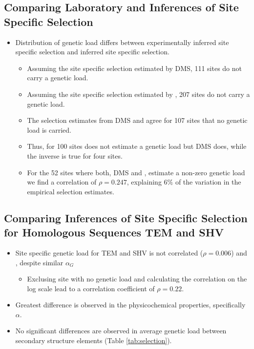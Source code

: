 \documentclass[12pt]{article}
\begin{document}
\subsection*{Comparing Laboratory and \selac Inferences of Site Specific Selection}
\begin{itemize}
	\item Distribution of genetic load differs between experimentally inferred site specific selection and \selac inferred site specific selection.
	\begin{itemize}
		\item Assuming the site specific selection estimated by DMS, 111 sites do not carry a genetic load.
		\item Assuming the site specific selection estimated by \selac, 207 sites do not carry a genetic load.
		\item The selection estimates from DMS and \selac agree for 107 sites that no genetic load is carried.
		\item Thus, for 100 sites \selac does not estimate a genetic load but DMS does, while the inverse is true for four sites.
		\item For the 52 sites where both, DMS and \selac, estimate a non-zero genetic load we find a correlation of $\rho = 0.247$, explaining $6 \%$ of the variation in the empirical selection estimates.
	\end{itemize}
\end{itemize}

\subsection*{Comparing \selac Inferences of Site Specific Selection for Homologous Sequences TEM and SHV}
\begin{itemize}
	\item Site specific genetic load for TEM and SHV is not correlated ($\rho = 0.006$) and , despite similar $\alpha_G$
	\begin{itemize}
	 \item Exclusing site with no genetic load and calculating the correlation on the log scale lead to a correlation coefficient of $\rho = 0.22$. 
	\end{itemize}
	\item Greatest difference is observed in the physicochemical properties, specifically $\alpha$.
	\item No significant differences are observed in average genetic load between secondary structure elements (Table \ref{tab:selection}).
\end{itemize}
\end{document}
